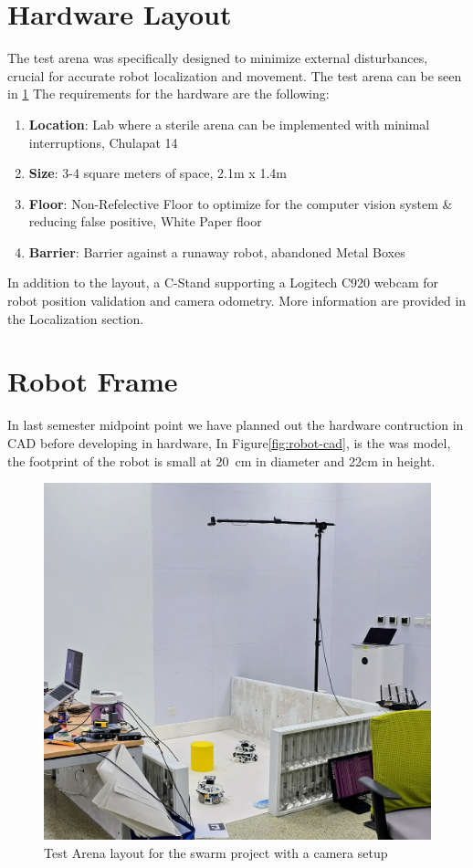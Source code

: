 \section{Hardware Layout}
The test arena was specifically designed to minimize external disturbances, crucial for accurate robot localization and movement. The test arena can be seen in \ref{fig:arena-layout} The requirements for the hardware are the following:

\begin{enumerate}
    \item \textbf{Location}: Lab where a sterile arena can be implemented with minimal interruptions, Chulapat 14
    \item \textbf{Size}: 3-4 square meters of space, 2.1m x 1.4m
    \item \textbf{Floor}: Non-Refelective Floor to optimize for the computer vision system \& reducing false positive, White Paper floor
    \item \textbf{Barrier}: Barrier against a runaway robot, abandoned Metal Boxes
\end{enumerate}
In addition to the layout, a C-Stand supporting a Logitech C920 webcam for robot position validation and camera odometry. More information are provided in the Localization section.




\section{Robot Frame}

In last semester midpoint point we have planned out the hardware contruction in CAD before developing in hardware, In Figure\ref{fig:robot-cad}, is the was model, the footprint of the robot is small at 20 cm in diameter and 22cm in height.

\begin{figure}[H]
    \centering
    \includegraphics[width=0.65\linewidth]{assets/images/hardware/room-layout.jpg}
    \caption{Test Arena layout for the swarm project with a camera setup}
    \label{fig:arena-layout}
\end{figure}

